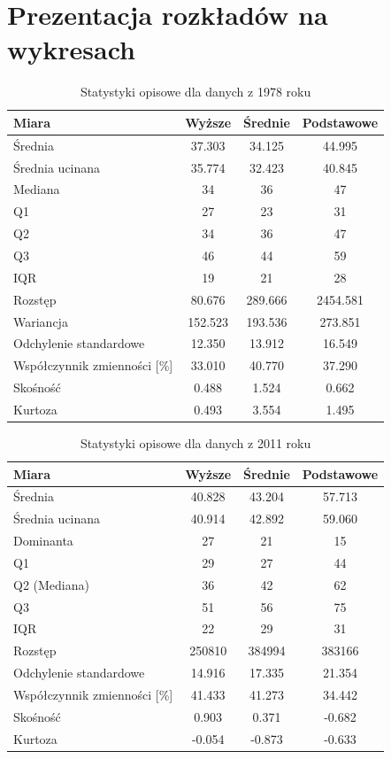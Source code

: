 \documentclass[10pt]{article}
\begin{document}
\section{Prezentacja rozkładów na wykresach}

\begin{table}[H]
	\centering
	\caption{Statystyki opisowe dla danych z 1978 roku}
	\label{tab:1978}
	\small
	\begin{tabular}{lccc}
		\toprule
		\textbf{Miara} & \textbf{Wyższe} & \textbf{Średnie} & \textbf{Podstawowe} \\
		\midrule
		Średnia & 37.303 & 34.125 & 44.995 \\
		Średnia ucinana & 35.774 & 32.423 & 40.845 \\
		Mediana & 34 & 36 & 47 \\
		Q1 & 27 & 23 & 31 \\
		Q2 & 34 & 36 & 47 \\
		Q3 & 46 & 44 & 59 \\
		IQR & 19 & 21 & 28 \\
		Rozstęp & 80.676 & 289.666 & 2454.581 \\
		Wariancja & 152.523 & 193.536 & 273.851 \\
		Odchylenie standardowe & 12.350 & 13.912 & 16.549 \\
		Współczynnik zmienności [\%] & 33.010 & 40.770 & 37.290 \\
		Skośność & 0.488 & 1.524 & 0.662 \\
		Kurtoza & 0.493 & 3.554 & 1.495 \\
		\bottomrule
	\end{tabular}
\end{table}

\begin{table}[H]
	\centering
	\caption{Statystyki opisowe dla danych z 2011 roku}
	\label{tab:2011}
	\small
	\begin{tabular}{lccc}
		\toprule
		\textbf{Miara} & \textbf{Wyższe} & \textbf{Średnie} & \textbf{Podstawowe} \\
		\midrule
		Średnia & 40.828 & 43.204 & 57.713 \\
		Średnia ucinana & 40.914 & 42.892 & 59.060 \\
		Dominanta & 27 & 21 & 15 \\
		Q1 & 29 & 27 & 44 \\
		Q2 (Mediana) & 36 & 42 & 62 \\
		Q3 & 51 & 56 & 75 \\
		IQR & 22 & 29 & 31 \\
		Rozstęp & 250810 & 384994 & 383166 \\
		Odchylenie standardowe & 14.916 & 17.335 & 21.354 \\
		Współczynnik zmienności [\%] & 41.433 & 41.273 & 34.442 \\
		Skośność & 0.903 & 0.371 & -0.682 \\
		Kurtoza & -0.054 & -0.873 & -0.633 \\
		\bottomrule
	\end{tabular}
\end{table}
\end{document}
